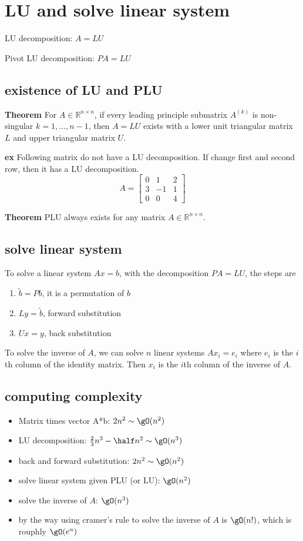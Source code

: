 \documentclass{article}%
\begin{document}
\section{LU and solve linear system}

LU decomposition: $A=LU$

Pivot LU decomposition: $PA=LU$

\subsection{existence of LU and PLU}

\textbf{Theorem} For $A \in \mathbb{R}^{n \times n}$, if every leading principle submatrix $A^{(k)}$ is non-singular $k=1, \ldots, n-1$, then $A=L U$ exists with a lower unit triangular matrix $L$ and upper triangular matrix $U$.

\textbf{ex} Following matrix do not have a LU decomposition. If change first and second row, then it has a LU decomposition.
$$
A=\begin{bmatrix}
    0 & 1 & 2 \\
    3&-1&1\\
    0&0&4
\end{bmatrix}
$$

\textbf{Theorem} PLU always exists for any matrix $A \in \mathbb{R}^{n \times n}$.

\subsection{solve linear system}
To solve a linear system $Ax=b$, with the decomposition $PA=LU$, the steps are 
\begin{enumerate}
    \item $\tilde{b}=Pb$, it is a permutation of $b$
    \item $Ly=\tilde{b}$, forward substitution
    \item $Ux=y$, back substitution
\end{enumerate}
To solve the inverse of $A$, we can solve $n$ linear systems $Ax_i=e_i$ where $e_i$ is the $i$th column of the identity matrix. Then $x_i$ is the $i$th column of the inverse of $A$.

\subsection{computing complexity}
\begin{itemize}
    \item Matrix times vector A*b: $2n^2\sim \gO(n^2)$
    \item LU decomposition: $\frac{2}{3}n^3-\half n^2\sim \gO(n^3)$
    \item back and forward substitution: $2n^2\sim \gO(n^2)$
    \item solve linear system given PLU (or LU): $\gO(n^2)$
    \item solve the inverse of $A$: $\gO(n^3)$
    \item by the way using cramer's rule to solve the inverse of $A$ is $\gO(n!)$, which is rouphly $\gO(e^n)$
\end{itemize}
\end{document}

